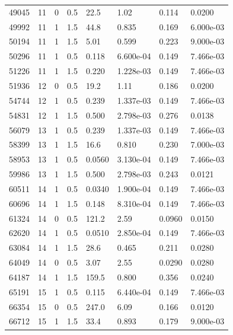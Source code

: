 \documentclass[preview]{standalone}
\begin{document}
{{{\begin{tabular}{L{1.2cm}C{1.2cm} C{0.3cm}C{0.5cm} C{1.4cm}C{1.4cm} C{1.4cm}C{1.4cm}}
  49045  &    11  & 0     & 0.5 &  22.5  & 1.02  & 0.114 &  0.0200   \\ 
  49992  &    11  & 1     & 1.5 &  44.8  & 0.835  & 0.169 &  6.000e-03   \\ 
  50194  &    11  & 1     & 1.5 &  5.01  & 0.599  & 0.223 &  9.000e-03   \\ 
  50296  &    11  & 1     & 0.5 &  0.118  & 6.600e-04  & 0.149 &  7.466e-03   \\ 
  51226  &    11  & 1     & 1.5 &  0.220  & 1.228e-03  & 0.149 &  7.466e-03   \\ 
  51936  &    12  & 0     & 0.5 &  19.2  & 1.11  & 0.186 &  0.0200   \\ 
  54744  &    12  & 1     & 0.5 &  0.239  & 1.337e-03  & 0.149 &  7.466e-03   \\ 
  54831  &    12  & 1     & 1.5 &  0.500  & 2.798e-03  & 0.276 &  0.0138   \\ 
  56079  &    13  & 1     & 0.5 &  0.239  & 1.337e-03  & 0.149 &  7.466e-03   \\ 
  58399  &    13  & 1     & 1.5 &  16.6  & 0.810  & 0.230 &  7.000e-03   \\ 
  58953  &    13  & 1     & 0.5 &  0.0560  & 3.130e-04  & 0.149 &  7.466e-03   \\ 
  59986  &    13  & 1     & 1.5 &  0.500  & 2.798e-03  & 0.243 &  0.0121   \\ 
  60511  &    14  & 1     & 0.5 &  0.0340  & 1.900e-04  & 0.149 &  7.466e-03   \\ 
  60696  &    14  & 1     & 1.5 &  0.148  & 8.310e-04  & 0.149 &  7.466e-03   \\ 
  61324  &    14  & 0     & 0.5 &  121.2  & 2.59  & 0.0960 &  0.0150   \\ 
  62620  &    14  & 1     & 0.5 &  0.0510  & 2.850e-04  & 0.149 &  7.466e-03   \\ 
  63084  &    14  & 1     & 1.5 &  28.6  & 0.465  & 0.211 &  0.0280   \\ 
  64049  &    14  & 0     & 0.5 &  3.07  & 2.55  & 0.0290 &  0.0280   \\ 
  64187  &    14  & 1     & 1.5 &  159.5  & 0.800  & 0.356 &  0.0240   \\ 
  65191  &    15  & 1     & 0.5 &  0.115  & 6.440e-04  & 0.149 &  7.466e-03   \\ 
  66354  &    15  & 0     & 0.5 &  247.0  & 6.09  & 0.166 &  0.0120   \\ 
  66712  &    15  & 1     & 1.5 &  33.4  & 0.893  & 0.179 &  9.000e-03   \\ 

\end{tabular}}}}
\end{document}
